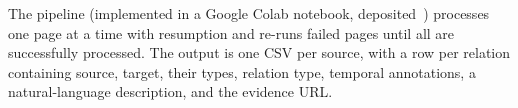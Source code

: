 The pipeline (implemented in a Google Colab notebook, deposited~\cite{lack-re}) processes one page at a time with resumption and re-runs failed pages until all are successfully processed.
The output is one CSV per source, with a row per relation containing source, target, their types, relation type, temporal annotations, a natural-language description, and the evidence URL.
%
%

